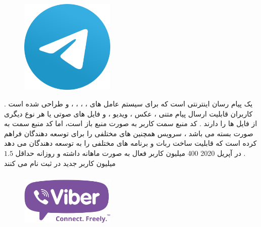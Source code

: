 \documentclass[12pt]{book}
\begin{document}
\newpage

\subsubsection{}

\begin{figure}
  \vspace{200pt}
  \begin{center}
    \includegraphics[width=0.4\textwidth]{./600px-Telegram_2019_Logo.svg.png}
  \end{center}
  \vspace{-20pt}
  \caption{}
  \vspace{-10pt}
\end{figure}


یک پیام رسان اینترنتی است که برای سیستم عامل های
،
،
،
،
و
طراحی شده است .
کاربران 
قابلیت ارسال پیام متنی ، عکس ، ویدیو ، 
و فایل های صوتی یا هر نوع دیگری از فایل ها را دارند .
کد منبع سمت کاربر 
به صورت منبع باز است، اما کد منبع سمت 
به صورت بسته می باشد ، 
سرویس
همچنین
های مختلفی را برای توسعه دهندگان فراهم کرده است که قابلیت ساخت ربات و برنامه های مختلفی را به توسعه دهندگان می دهد .
در آپریل 2020 
400 میلیون کاربر فعال به صورت ماهانه داشته و روزانه حداقل 
$1.5$
میلیون کاربر جدید در 
ثبت نام می کنند



\newpage

\subsubsection{}

\begin{figure}
  \vspace{200pt}
  \begin{center}
    \includegraphics[width=0.4\textwidth]{./Viber_logo.svg.png}
  \end{center}
  \vspace{-20pt}
  \caption{}
  \vspace{-10pt}
\end{figure}
\end{document}
